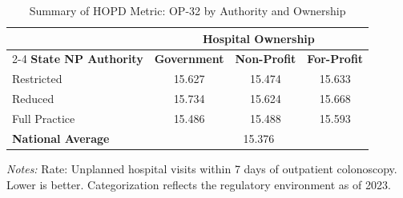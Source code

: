 \begin{table}[htbp]
    \centering
    \caption{Summary of HOPD Metric: OP-32 by Authority and Ownership}
    \label{tab:hopd_op_32_own}
    \vspace{0.2cm}
    \begin{tabular}{lccc}
        \toprule
        & \multicolumn{3}{c}{\textbf{Hospital Ownership}} \\
        \cmidrule(lr){2-4}
        \textbf{State NP Authority} & \textbf{Government} & \textbf{Non-Profit} & \textbf{For-Profit} \\
        \midrule
        Restricted & 15.627 & 15.474 & 15.633 \\
        Reduced & 15.734 & 15.624 & 15.668 \\
        Full Practice & 15.486 & 15.488 & 15.593 \\
        \midrule
        \textbf{National Average} & \multicolumn{3}{c}{15.376} \\
        \bottomrule
    \end{tabular}
    \vspace{0.1cm}
    \begin{minipage}{0.85\textwidth}
        \footnotesize \textit{Notes:} Rate: Unplanned hospital visits within 7 days of outpatient colonoscopy. Lower is better. Categorization reflects the regulatory environment as of 2023.
    \end{minipage}
\end{table}